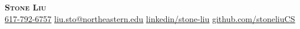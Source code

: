 \begin{center}
	\textbf{\Huge \scshape Stone Liu} \\ \vspace{0.25pt}
	\uline{617-792-6757} \quad
	\href{mailto:liu.sto@northeastern.edu}{\uline{liu.sto@northeastern.edu}} \quad
	\href{http://linkedin.com/in/stone-liu}{\uline{linkedin/stone-liu}} \quad
	\href{https://github.com/stoneliuCS}{\uline{github.com/stoneliuCS}}
\end{center}
